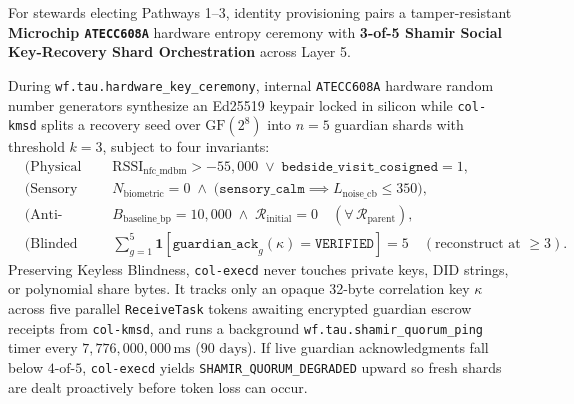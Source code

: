 For stewards electing Pathways 1--3, identity provisioning pairs a tamper-resistant \textbf{Microchip
\texttt{ATECC608A}} hardware entropy ceremony \parencite{microchip_atecc608a} with \textbf{3-of-5
Shamir Social Key-Recovery Shard Orchestration} across Layer 5.

\begin{definition}
\label{def:tau-shamir}
During \texttt{wf.tau.hardware\_key\_ceremony}, internal \texttt{ATECC608A} hardware random number
generators synthesize an Ed25519 keypair locked in silicon while \texttt{col-kmsd} splits a recovery
seed over $\mathrm{GF}(2^8)$ into $n = 5$ guardian shards with threshold $k = 3$, subject to four
invariants:
{\footnotesize
\begin{align}
    &\text{(Physical Co-Presence)} && \mathrm{RSSI}_{\mathrm{nfc\_mdbm}} > -55{,}000 \;\lor\; \mathtt{bedside\_visit\_cosigned} = 1, \label{eq:tau-nfc}\\
    &\text{(Sensory \& Anti-Biometric)} && N_{\mathrm{biometric}} = 0 \;\land\; \big(\mathtt{sensory\_calm} \implies L_{\mathrm{noise\_cb}} \le 350\big), \label{eq:tau-calm}\\
    &\text{(Anti-Dynastic Baseline)} && B_{\mathrm{baseline\_bp}} = 10{,}000 \;\land\; \mathcal{R}_{\mathrm{initial}} = 0 \quad (\forall\,\mathcal{R}_{\mathrm{parent}}), \label{eq:tau-antidynastic}\\
    &\text{(Blinded Shamir Quorum)} && \sum_{g=1}^{5} \mathbf{1}\!\left[\mathtt{guardian\_ack}_{g}(\kappa) = \mathtt{VERIFIED}\right] = 5 \quad (\text{reconstruct at } \ge 3). \label{eq:tau-shamir}
\end{align}
}
Preserving Keyless Blindness, \texttt{col-execd} never touches private keys, DID strings, or
polynomial share bytes. It tracks only an opaque 32-byte correlation key $\kappa$ across five
parallel \texttt{ReceiveTask} tokens awaiting encrypted guardian escrow receipts from
\texttt{col-kmsd}, and runs a background \texttt{wf.tau.shamir\_quorum\_ping} timer every
$7{,}776{,}000{,}000\,\mathrm{ms}$ ($90\text{ days}$). If live guardian acknowledgments fall below
$4\text{-of-}5$, \texttt{col-execd} yields \texttt{SHAMIR\_QUORUM\_DEGRADED} upward so fresh shards
are dealt proactively before token loss can occur.
\end{definition}

